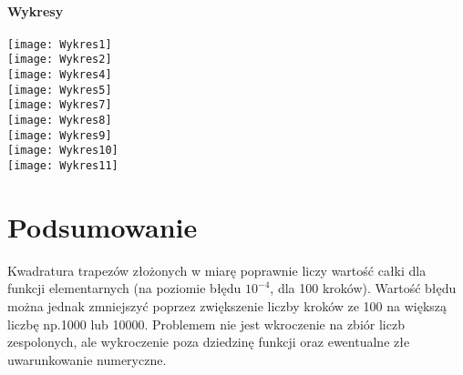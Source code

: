 \documentclass{article}
\begin{document}
\paragraph{Wykresy\\}
\graphicspath{ {./images/} }
\texttt{[image: Wykres1]}\\
\texttt{[image: Wykres2]}\\
\texttt{[image: Wykres4]}\\
\texttt{[image: Wykres5]}\\
\texttt{[image: Wykres7]}\\
\texttt{[image: Wykres8]}\\
\texttt{[image: Wykres9]}\\
\texttt{[image: Wykres10]}\\
\texttt{[image: Wykres11]}\\
\section{Podsumowanie}
Kwadratura trapezów złożonych w miarę poprawnie liczy wartość całki dla funkcji elementarnych (na poziomie błędu $10^{-4}$, dla 100 kroków). Wartość błędu można jednak zmniejszyć poprzez zwiększenie liczby kroków ze 100 na większą liczbę np.1000 lub 10000. Problemem nie jest wkroczenie na zbiór liczb zespolonych, ale wykroczenie poza dziedzinę funkcji oraz ewentualne złe uwarunkowanie numeryczne.
\end{document}
